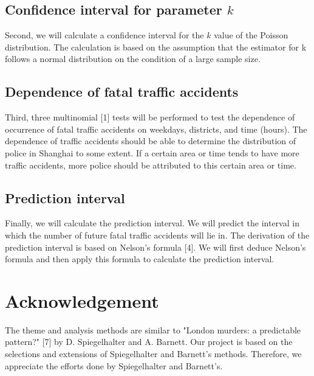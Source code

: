 \documentclass[a4paper,12pt]{article}
\begin{document}
\subsection{Confidence interval for parameter $k$}
\noindent Second, we will calculate a confidence interval for the $k$ value of the Poisson distribution. The calculation is based on the assumption that the estimator for k follows a normal distribution on the condition of a large sample size.
\subsection{Dependence of fatal traffic accidents}
\noindent Third, three multinomial [1] tests will be performed to test the dependence of occurrence of fatal traffic accidents on weekdays, districts, and time (hours). The dependence of traffic accidents should be able to determine the distribution of police in Shanghai to some extent. If a certain area or time tends to have more traffic accidents, more police should be attributed to this certain area or time.
\subsection{Prediction interval}
\noindent Finally, we will calculate the prediction interval. We will predict the interval in which the number of future fatal traffic accidents will lie in. The derivation of the prediction interval is based on Nelson's formula [4]. We will first deduce Nelson's formula and then apply this formula to calculate the prediction interval.
\section{Acknowledgement}
\noindent The theme and analysis methods are similar to "London murders: a predictable pattern?" [7] by D. Spiegelhalter and A. Barnett. Our project is based on the selections  and extensions of Spiegelhalter and Barnett's methods. Therefore, we appreciate the efforts done by  Spiegelhalter and Barnett's.
\end{document}
